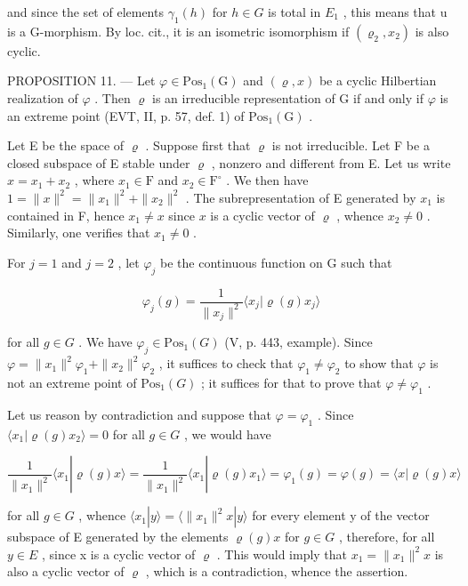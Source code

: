 and since the set of elements \(\gamma_{1}(h)\) for \(h \in G\) is total in \(E_{1}\) , this means that u is a G-morphism. By loc. cit., it is an isometric isomorphism if \((\varrho_{2}, x_{2})\) is also cyclic.

PROPOSITION 11. — Let \(\varphi \in \mathrm{Pos}_{1}(\mathrm{G})\) and \((\varrho, x)\) be a cyclic Hilbertian realization of \(\varphi\) . Then \(\varrho\) is an irreducible representation of G if and only if \(\varphi\) is an extreme point (EVT, II, p. 57, def. 1) of \(\mathrm{Pos}_{1}(\mathrm{G})\) .

Let E be the space of \(\varrho\) . Suppose first that \(\varrho\) is not irreducible. Let F be a closed subspace of E stable under \(\varrho\) , nonzero and different from E. Let us write \(x = x_1 + x_2\) , where \(x_1 \in \mathrm{F}\) and \(x_2 \in \mathrm{F}^\circ\) . We then have \(1 = \|x\|^2 = \|x_1\|^2 + \|x_2\|^2\) . The subrepresentation of E generated by \(x_1\) is contained in F, hence \(x_1 \neq x\) since \(x\) is a cyclic vector of \(\varrho\) , whence \(x_2 \neq 0\) . Similarly, one verifies that \(x_1 \neq 0\) .

For \(j = 1\) and \(j = 2\) , let \(\varphi_j\) be the continuous function on G such that

\[
\varphi_ {j} (g) = \frac {1}{\| x _ {j} \| ^ {2}} \langle x _ {j} | \varrho (g) x _ {j} \rangle
\]

for all \(g \in G\) . We have \(\varphi_{j} \in \mathrm{Pos}_{1}(G)\) (V, p. 443, example). Since \(\varphi = \|x_{1}\|^{2}\varphi_{1} + \|x_{2}\|^{2}\varphi_{2}\) , it suffices to check that \(\varphi_{1} \neq \varphi_{2}\) to show that \(\varphi\) is not an extreme point of \(\mathrm{Pos}_{1}(G)\) ; it suffices for that to prove that \(\varphi \neq \varphi_{1}\) .

Let us reason by contradiction and suppose that \(\varphi = \varphi_1\) . Since \(\langle x_1 | \varrho(g)x_2 \rangle = 0\) for all \(g \in G\) , we would have

\[
\frac {1}{\| x _ {1} \| ^ {2}} \langle x _ {1} | \varrho (g) x \rangle = \frac {1}{\| x _ {1} \| ^ {2}} \langle x _ {1} | \varrho (g) x _ {1} \rangle = \varphi_ {1} (g) = \varphi (g) = \langle x | \varrho (g) x \rangle
\]

for all \(g \in G\) , whence \(\langle x_{1} | y \rangle = \langle \|x_{1}\|^{2}x | y \rangle\) for every element y of the vector subspace of E generated by the elements \(\varrho(g)x\) for \(g \in G\) , therefore, for all \(y \in E\) , since x is a cyclic vector of \(\varrho\) . This would imply that \(x_{1} = \|x_{1}\|^{2}x\) is also a cyclic vector of \(\varrho\) , which is a contradiction, whence the assertion.

